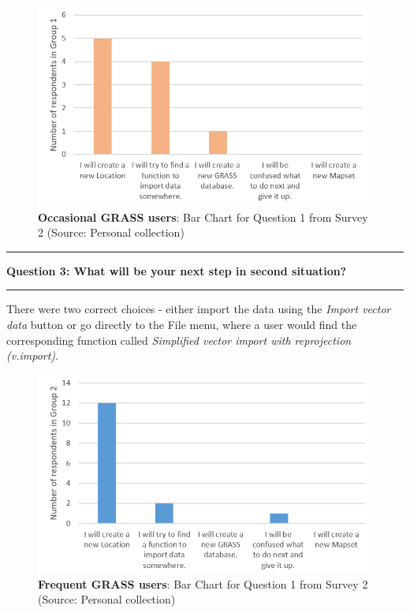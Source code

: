 \documentclass[a4paper,10pt,twoside]{article}
\begin{document}
\vspace{0.3cm}
\begin{figure}[hbt!] 
\begin{center}
\includegraphics[width=14cm]{../surveys/analyzed_data/survey2_question1_histogram_group1.png} 
\caption[\textbf{Occasional GRASS users}: Bar Chart  for Question 1 from Survey 2]{\textbf{Occasional GRASS users}: Bar Chart for Question 1 from Survey 2 (Source: Personal collection)}
\label{fig:survey2_question1_histogram_group1}
\end{center}
\end{figure}

\par\noindent\rule{\textwidth}{0.4pt}
\noindent \textbf{Question 3: What will be your next step in second situation?}
\par\noindent\rule{\textwidth}{0.4pt}

\noindent There were two correct choices - either import the data
using the \textit{Import vector data} button or go directly to the
File menu, where a user would find the corresponding function called
\textit{Simplified vector import with reprojection (v.import)}. 

\vspace{0.3cm}
\begin{figure}[hbt!] 
\begin{center}
\includegraphics[width=13.5cm]{../surveys/analyzed_data/survey2_question1_histogram_group2.png} 
\caption[\textbf{Frequent GRASS users}: Bar Chart for Question 1 from Survey 2]{\textbf{Frequent GRASS users}: Bar Chart for Question 1 from Survey 2 (Source: Personal collection)}
\label{fig:survey2_question1_histogram_group2}
\end{center}
\end{figure}
\end{document}
